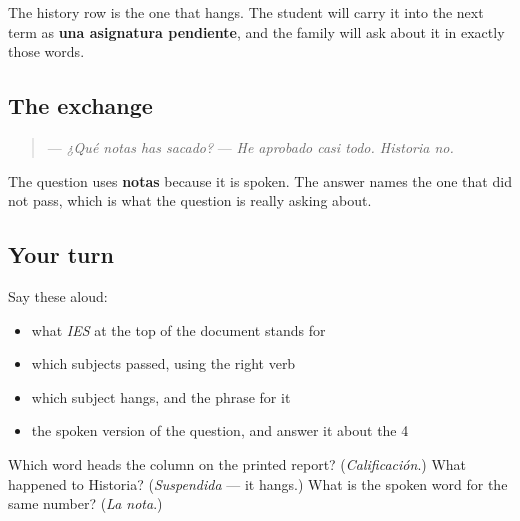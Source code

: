 The history row is the one that hangs. The student will carry it into the next term as \textbf{una asignatura pendiente}, and the family will ask about it in exactly those words.

\subsection*{The exchange}
\begin{quote}
— \emph{¿Qué notas has sacado?} — \emph{He aprobado casi todo. Historia no.}
\end{quote}

The question uses \textbf{notas} because it is spoken. The answer names the one that did not pass, which is what the question is really asking about.

\subsection*{Your turn}
Say these aloud:

\begin{itemize}
\raggedright
  \item what \emph{IES} at the top of the document stands for
  \item which subjects passed, using the right verb
  \item which subject hangs, and the phrase for it
  \item the spoken version of the question, and answer it about the 4
\end{itemize}

\begin{tcolorbox}[breakable,colback=teal!4,colframe=teal!35!black,title={Before you move on}]
Which word heads the column on the printed report? (\emph{Calificación}.) What happened to Historia? (\emph{Suspendida} — it hangs.) What is the spoken word for the same number? (\emph{La nota}.)
\end{tcolorbox}
